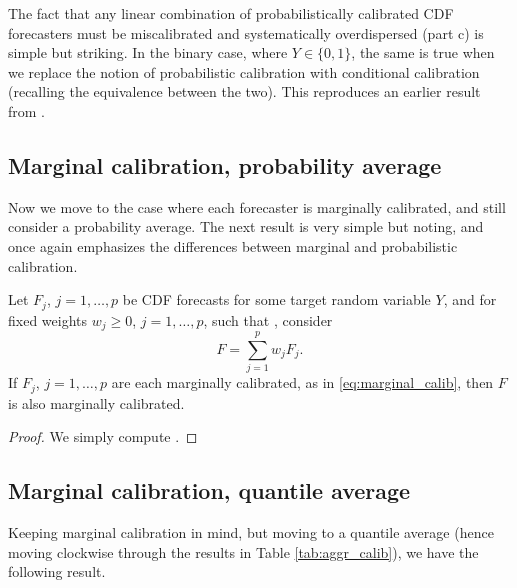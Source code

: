 \documentclass{article}
\begin{document}
The fact that any linear combination of probabilistically calibrated CDF
forecasters must be miscalibrated and systematically overdispersed (part c) is
simple but striking. In the binary case, where $Y \in \{0,1\}$, the same is true
when we replace the notion of probabilistic calibration with conditional
calibration (recalling the equivalence between the two). This reproduces an
earlier result from \citet{ranjan2010combining}.   

\subsection{Marginal calibration, probability average}

Now we move to the case where each forecaster is marginally calibrated, and
still consider a probability average. The next result is very simple but 
noting, and once again emphasizes the differences between marginal and
probabilistic calibration. 

\begin{theorem}
\label{thm:marginal_prob}
Let $F_j$, $j=1,\dots,p$ be CDF forecasts for some target random variable $Y$,
and for fixed weights $w_j \geq 0$, $j=1,\dots,p$, such that
, consider  
\[
F = \sum_{j=1}^p w_j F_j.
\]
If $F_j$, $j=1,\dots,p$ are each marginally calibrated, as in
\eqref{eq:marginal_calib}, then $F$ is also marginally calibrated.  
\end{theorem}

\begin{proof}
We simply compute .
\end{proof}

\subsection{Marginal calibration, quantile average}

Keeping marginal calibration in mind, but moving to a quantile average (hence
moving clockwise through the results in Table \ref{tab:aggr_calib}), we have the
following result. 
\end{document}
